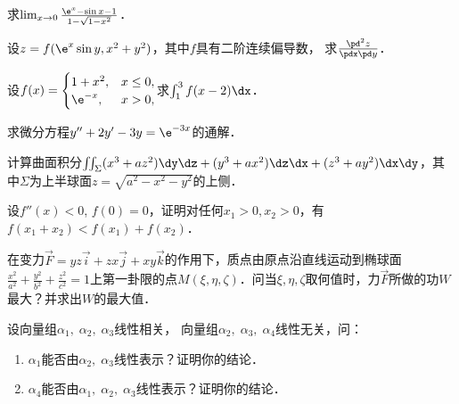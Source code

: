\documentclass[plain,noanswer,medmath]{../../template/jnuexam}
\begin{document}


\begin{problem}
求$\lim_{x \to 0} \frac{\e^x - \sin x - 1}{1 - \sqrt{1 - x^2}}$．
\end{problem}


\begin{problem}
设$z = f(\e^x\sin y, x^2 + y^2)$，其中$f$具有二阶连续偏导数，
求$\frac{\pd^2 z}{\pdx\pd y}$．
\end{problem}


\begin{problem}
设$f(x) = \begin{cases}
  1 + x^2, & x \le 0, \\
 \e^{- x}, & x > 0, \\
\end{cases}$求$\int_1^3f(x - 2) \dx$．
\end{problem}



\begin{problem}
求微分方程$y'' + 2y' - 3y = \e^{- 3x}$的通解．
\end{problem}



\begin{problem}
计算曲面积分$\iint_{\Sigma}(x^3 + az^2)\dy\dz + (y^3 + ax^2)\dz\dx + (z^3 + ay^2)\dx\dy$，其中$\Sigma$为上半球面$z = \sqrt{a^2 - x^2 - y^2}$的上侧．
\end{problem}



\begin{problem}
设$f''(x) < 0$, $f(0) = 0$，证明对任何$x_1 > 0,x_2 > 0$，有$f(x_1 + x_2) < f(x_1) + f(x_2)$．
\end{problem}



\begin{problem}
在变力$\vec{F}= yz\vec{i}+ zx\vec{j}+ xy\vec{k}$的作用下，质点由原点沿直线运动到椭球面$\frac{x^2}{a^2} + \frac{y^2}{b^2} + \frac{z^2}{c^2} = 1$上第一卦限的点$M(\xi ,\eta ,\zeta)$．问当$\xi ,\eta ,\zeta$取何值时，力$\vec{F}$所做的功$W$最大？并求出$W$的最大值．
\end{problem}



\begin{problem}
设向量组$\alpha_1,\;\alpha_2,\;\alpha_3$线性相关，
向量组$\alpha_2,\;\alpha_3,\;\alpha_4$线性无关，问：
\begin{enumerate}
\item $\alpha_1$能否由$\alpha_2,\;\alpha_3$线性表示？证明你的结论．
\item $\alpha_4$能否由$\alpha_1,\;\alpha_2,\;\alpha_3$线性表示？证明你的结论．
\end{enumerate}
\end{problem}
\end{document}
